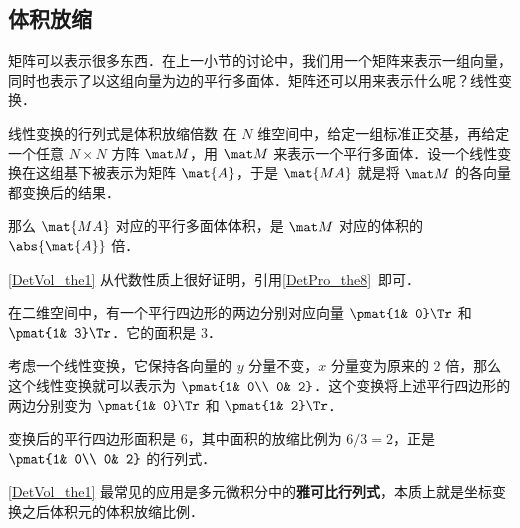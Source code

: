 


\subsection{体积放缩}

矩阵可以表示很多东西．在上一小节的讨论中，我们用一个矩阵来表示一组向量，同时也表示了以这组向量为边的平行多面体．矩阵还可以用来表示什么呢？线性变换．

\begin{theorem}{线性变换的行列式是体积放缩倍数}\label{DetVol_the1}
在 $N$ 维空间中，给定一组标准正交基，再给定一个任意 $N\times N$ 方阵 $\mat M$，用 $\mat M$ 来表示一个平行多面体．设一个线性变换在这组基下被表示为矩阵 $\mat{A}$，于是 $\mat{MA}$ 就是将 $\mat M$ 的各向量都变换后的结果．

那么 $\mat{MA}$ 对应的平行多面体体积，是 $\mat M$ 对应的体积的 $\abs{\mat{A}}$ 倍．
\end{theorem}

\autoref{DetVol_the1} 从代数性质上很好证明，引用\autoref{DetPro_the8}~即可．

\begin{example}{}
在二维空间中，有一个平行四边形的两边分别对应向量 $\pmat{1& 0}\Tr$ 和 $\pmat{1& 3}\Tr$．它的面积是 $3$．

考虑一个线性变换，它保持各向量的 $y$ 分量不变，$x$ 分量变为原来的 $2$ 倍，那么这个线性变换就可以表示为 $\pmat{1& 0\\ 0& 2}$．这个变换将上述平行四边形的两边分别变为 $\pmat{1& 0}\Tr$ 和 $\pmat{1& 2}\Tr$．

变换后的平行四边形面积是 $6$，其中面积的放缩比例为 $6/3=2$，正是 $\pmat{1& 0\\ 0& 2}$ 的行列式．
\end{example}

\autoref{DetVol_the1} 最常见的应用是多元微积分中的\textbf{雅可比行列式}，本质上就是坐标变换之后体积元的体积放缩比例．



























